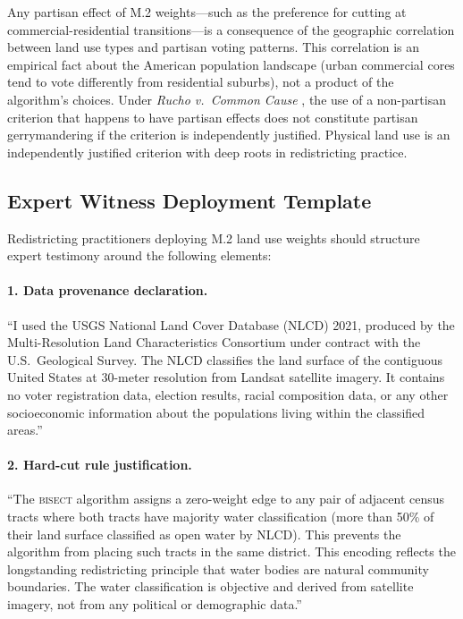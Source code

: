 Any partisan effect of M.2 weights---such as the preference for cutting
at commercial-residential transitions---is a consequence of the geographic
correlation between land use types and partisan voting patterns.
This correlation is an empirical fact about the American population
landscape (urban commercial cores tend to vote differently from
residential suburbs), not a product of the algorithm's choices.
Under \textit{Rucho v.\ Common Cause} \citeyearpar{rucho2019}, the
use of a non-partisan criterion that happens to have partisan effects
does not constitute partisan gerrymandering if the criterion is
independently justified.
Physical land use is an independently justified criterion with deep
roots in redistricting practice.

\subsection{Expert Witness Deployment Template}

Redistricting practitioners deploying M.2 land use weights should
structure expert testimony around the following elements:

\paragraph{1. Data provenance declaration.}
``I used the USGS National Land Cover Database (NLCD) 2021, produced
by the Multi-Resolution Land Characteristics Consortium under contract
with the U.S.\ Geological Survey.
The NLCD classifies the land surface of the contiguous United States
at 30-meter resolution from Landsat satellite imagery.
It contains no voter registration data, election results, racial
composition data, or any other socioeconomic information about the
populations living within the classified areas.''

\paragraph{2. Hard-cut rule justification.}
``The \textsc{bisect} algorithm assigns a zero-weight edge to any pair
of adjacent census tracts where both tracts have majority water
classification (more than 50\% of their land surface classified as
open water by NLCD).
This prevents the algorithm from placing such tracts in the same district.
This encoding reflects the longstanding redistricting principle that
water bodies are natural community boundaries.
The water classification is objective and derived from satellite imagery,
not from any political or demographic data.''

